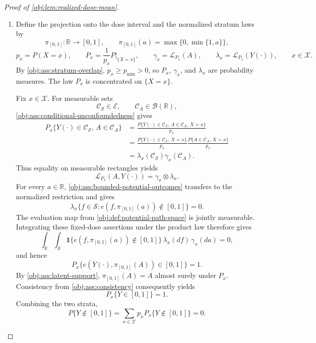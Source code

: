 \begin{proof}[Proof of \cref{obj:lem:realized-dose-mean}]
\begin{enumerate}
\item Define the projection onto the dose interval and the normalized stratum laws by
\[
\pi_{[0,1]}:\mathbb R\longrightarrow[0,1],
\qquad
\pi_{[0,1]}(a)=\max\{0,\min\{1,a\}\},
\]
\[
p_x=P(X=x),
\qquad
P_x=\frac{1}{p_x}P|_{\{X=x\}},
\qquad
\gamma_x=\mathcal L_{P_x}(A),
\qquad
\lambda_x=\mathcal L_{P_x}(Y(\cdot)),
\qquad x\in\mathcal X.
\]
By \cref{obj:ass:stratum-overlap}, \(p_x\ge p_{\min}>0\), so \(P_x\), \(\gamma_x\), and \(\lambda_x\) are probability measures. The law \(P_x\) is concentrated on \(\{X=x\}\).

Fix \(x\in\mathcal X\). For measurable sets
\[
\mathcal C_{\mathcal S}\in\mathcal E,
\qquad
\mathcal C_A\in\mathcal B(\mathbb R),
\]
\cref{obj:ass:conditional-unconfoundedness} gives
\[
\begin{aligned}
P_x\{Y(\cdot)\in\mathcal C_{\mathcal S},\,A\in\mathcal C_A\}
&=\frac{P\{Y(\cdot)\in\mathcal C_{\mathcal S},\,A\in\mathcal C_A,\,X=x\}}{p_x}\\
&=\frac{P\{Y(\cdot)\in\mathcal C_{\mathcal S},\,X=x\}}{p_x}
  \frac{P\{A\in\mathcal C_A,\,X=x\}}{p_x}\\
&=\lambda_x(\mathcal C_{\mathcal S})\gamma_x(\mathcal C_A).
\end{aligned}
\]
Thus equality on measurable rectangles yields
\[
\mathcal L_{P_x}(A,Y(\cdot))=\gamma_x\otimes\lambda_x.
\]
For every \(a\in\mathbb R\), \cref{obj:ass:bounded-potential-outcomes} transfers to the normalized restriction and gives
\[
\lambda_x\bigl\{f\in\mathcal S:
e(f,\pi_{[0,1]}(a))\notin[0,1]\bigr\}=0.
\]
The evaluation map from \cref{obj:def:potential-path-space} is jointly measurable. Integrating these fixed-dose assertions under the product law therefore gives
\[
\int_{\mathbb R}\int_{\mathcal S}
\mathbf1\{e(f,\pi_{[0,1]}(a))\notin[0,1]\}
\,\lambda_x(df)\,\gamma_x(da)=0,
\]
and hence
\[
P_x\{e(Y(\cdot),\pi_{[0,1]}(A))\in[0,1]\}=1.
\]
By \cref{obj:ass:latent-support}, \(\pi_{[0,1]}(A)=A\) almost surely under \(P_x\). Consistency from \cref{obj:ass:consistency} consequently yields
\[
P_x\{Y\in[0,1]\}=1.
\]
Combining the two strata,
\[
P\{Y\notin[0,1]\}
=\sum_{x\in\mathcal X}p_xP_x\{Y\notin[0,1]\}=0.
\]


\end{enumerate}
\end{proof}
